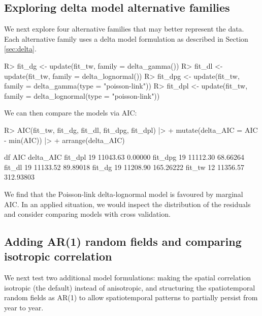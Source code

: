 \documentclass[article]{jss}\usepackage[]{graphicx}\usepackage[dvipsnames]{xcolor}
\begin{document}
\subsection{Exploring delta model alternative families}

We next explore four alternative families that may better represent the data.
Each alternative family uses a delta model formulation as described in Section \ref{sec:delta}.

\begin{Schunk}
\begin{Sinput}
R> fit_dg <- update(fit_tw, family = delta_gamma())
R> fit_dl <- update(fit_tw, family = delta_lognormal())
R> fit_dpg <- update(fit_tw, family = delta_gamma(type = "poisson-link"))
R> fit_dpl <- update(fit_tw, family = delta_lognormal(type = "poisson-link"))
\end{Sinput}
\end{Schunk}

We can then compare the models via AIC:

\begin{Schunk}
\begin{Sinput}
R> AIC(fit_tw, fit_dg, fit_dl, fit_dpg, fit_dpl) |>
+    mutate(delta_AIC = AIC - min(AIC)) |>
+    arrange(delta_AIC)
\end{Sinput}
\begin{Soutput}
        df      AIC delta_AIC
fit_dpl 19 11043.63   0.00000
fit_dpg 19 11112.30  68.66264
fit_dl  19 11133.52  89.89018
fit_dg  19 11208.90 165.26222
fit_tw  12 11356.57 312.93803
\end{Soutput}
\end{Schunk}

We find that the Poisson-link delta-lognormal model \citep{thorson2018poisson} is favoured by marginal AIC.
In an applied situation, we would inspect the distribution of the residuals and consider comparing models with cross validation.

\subsection{Adding AR(1) random fields and comparing isotropic correlation}\label{sec:dogar1}

We next test two additional model formulations: making the spatial correlation isotropic (the default) instead of anisotropic, and structuring the spatiotemporal random fields as AR(1) to allow spatiotemporal patterns to partially persist from year to year.
\end{document}
